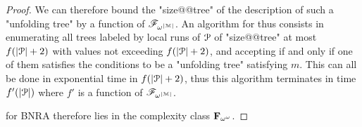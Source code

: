 \begin{proof}
	We can therefore bound the "size@@tree" of the description of such a "unfolding tree" by a function of $\mathscr{F}_{\omega^{|\mathcal{M}|}}$.
	An algorithm for \COVER thus consists in enumerating all trees labeled by local runs of $\mathcal{P}$ of "size@@tree" at most $f(|\mathcal{P}|+2)$ with values not exceeding $f(|\mathcal{P}|+2)$, and accepting if and only if one of them satisfies the conditions to be a "unfolding tree" satisfying $m$.
	This can all be done in exponential time in $f(|\mathcal{P}|+2)$, thus this algorithm terminates in time $f'(|\mathcal{P}|)$ where $f'$ is a function of $\mathscr{F}_{\omega^{|\mathcal{M}|}}$.
	
	\COVER for BNRA therefore lies in the complexity class $\mathbf{F}_{\omega^\omega}$.
\end{proof}
